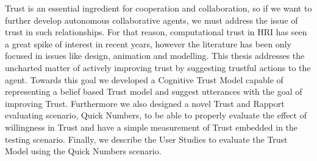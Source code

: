 \noindent  Trust is an essential ingredient for cooperation and collaboration, so if we want to further develop autonomous collaborative agents, we must address the issue of trust in such relationships. For that reason, computational trust in \ac{HRI} has seen a great spike of interest in recent years, however the literature has been only focused in issues like design, animation and modelling. This thesis addresses the uncharted matter of actively improving trust by suggesting trustful actions to the agent. Towards this goal we developed a Cognitive Trust Model capable of representing a belief based Trust model and suggest utterances with the goal of improving Trust. Furthermore we also designed a novel Trust and Rapport evaluating scenario, Quick Numbers, to be able to properly evaluate the effect of willingness in Trust and have a simple measurement of Trust embedded in the testing scenario. Finally, we describe the User Studies to evaluate the Trust Model using the Quick Numbers scenario.